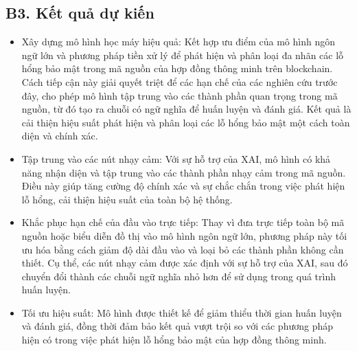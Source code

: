 \documentclass[letterpaper]{article}
\begin{document}
\subsection{B3. Kết quả dự kiến}

\begin{itemize}
    \item Xây dựng mô hình học máy hiệu quả: Kết hợp ưu điểm của mô hình ngôn ngữ lớn và phương pháp tiền xử lý để phát hiện và phân loại đa nhãn các lỗ hổng bảo mật trong mã nguồn của hợp đồng thông minh trên blockchain. Cách tiếp cận này giải quyết triệt để các hạn chế của các nghiên cứu trước đây, cho phép mô hình tập trung vào các thành phần quan trọng trong mã nguồn, từ đó tạo ra chuỗi có ngữ nghĩa để huấn luyện và đánh giá. Kết quả là cải thiện hiệu suất phát hiện và phân loại các lỗ hổng bảo mật một cách toàn diện và chính xác.

    \item Tập trung vào các nút nhạy cảm: Với sự hỗ trợ của XAI, mô hình có khả năng nhận diện và tập trung vào các thành phần nhạy cảm trong mã nguồn. Điều này giúp tăng cường độ chính xác và sự chắc chắn trong việc phát hiện lỗ hổng, cải thiện hiệu suất của toàn bộ hệ thống.

    \item Khắc phục hạn chế của đầu vào trực tiếp: Thay vì đưa trực tiếp toàn bộ mã nguồn hoặc biểu diễn đồ thị vào mô hình ngôn ngữ lớn, phương pháp này tối ưu hóa bằng cách giảm độ dài đầu vào và loại bỏ các thành phần không cần thiết. Cụ thể, các nút nhạy cảm được xác định với sự hỗ trợ của XAI, sau đó chuyển đổi thành các chuỗi ngữ nghĩa nhỏ hơn để sử dụng trong quá trình huấn luyện.

    \item Tối ưu hiệu suất: Mô hình được thiết kế để giảm thiểu thời gian huấn luyện và đánh giá, đồng thời đảm bảo kết quả vượt trội so với các phương pháp hiện có trong việc phát hiện lỗ hổng bảo mật của hợp đồng thông minh.
\end{itemize}

\printbibliography[heading=bibintoc, title={B4. Tài liệu tham khảo}]



\centering
\end{document}
